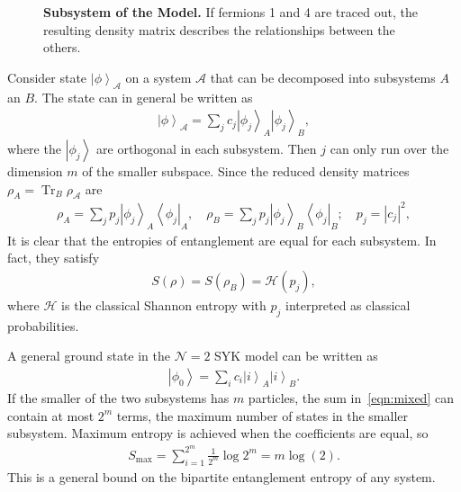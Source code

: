 \documentclass[12pt]{article} %
\renewcommand{\cal}{\mathcal}
\renewcommand{\th}[1]{\frac{1}{#1}}
\newcommand{\ket}[1]{\left|#1\right\rangle}
\newcommand{\bra}[1]{\left\langle#1\right|}
\DeclareMathOperator{\Tr}{Tr}
\begin{document}
\begin{figure}
	\centering
	\caption{\textbf{Subsystem of the Model.} If fermions 1 and 4 are traced out, the resulting density matrix describes the relationships between the others.}
	\label{fig:subsys}
\end{figure}

Consider state $\ket{\phi}_\cal{A}$ on a system $\cal A$ that can be decomposed into subsystems $A$ an $B$. The state can in general be written as 
\begin{align}
\ket{\phi}_\cal{A} = \sum_jc_j\ket{\phi_j}_A\ket{\phi_j}_B,
\end{align}
where the $\ket{\phi_j}$ are orthogonal in each subsystem. Then $j$ can only run over the dimension $m$ of the smaller subspace. Since the reduced density matrices $\rho_A = \Tr_B\rho_{\cal A}$ are
\begin{align}
\rho_A = \sum_jp_j\ket{\phi_j}_A\bra{\phi_j}_A, \quad \rho_B = \sum_jp_j\ket{\phi_j}_B\bra{\phi_j}_B; \quad p_j = |c_j|^2,
\end{align}
It is clear that the entropies of entanglement are equal for each subsystem. In fact, they satisfy 
\begin{align}
S(\rho) = S(\rho_B) = \cal{H}(p_j),
\end{align}
where $\cal H$ is the classical Shannon entropy with $p_j$ interpreted as classical probabilities. 

A general ground state in the $\cal N=2$ SYK model can be written as 
\begin{align}
\ket{\phi_0} = \sum_ic_i\ket{i}_A\ket{i}_B. \label{eqn:mixed}
\end{align}
If the smaller of the two subsystems has $m$ particles, the sum in~\ref{eqn:mixed} can contain at most $2^m$ terms, the maximum number of states in the smaller subsystem. Maximum entropy is achieved when the coefficients are equal, so 
\begin{align}
S_\text{max} = \sum_{i=1}^{2^m}\th{2^m}\log 2^m = m\log(2).\label{eqn:thermal}
\end{align}
This is a general bound on the bipartite entanglement entropy of any system.
\end{document}
